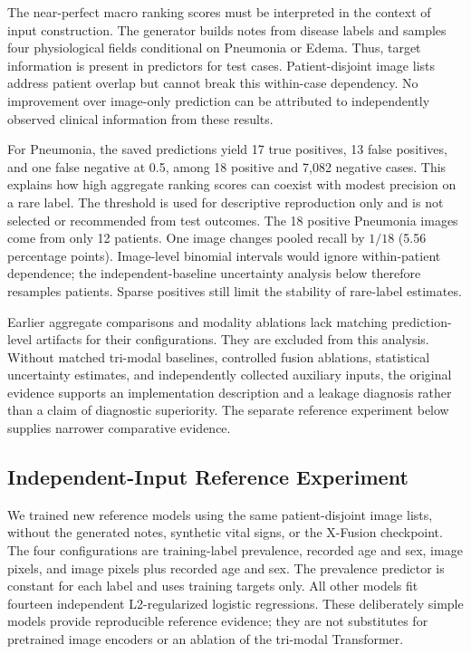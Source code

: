 \documentclass[runningheads,a4paper]{llncs}
\begin{document}
The near-perfect macro ranking scores must be interpreted in the context of input construction. The generator builds notes from disease labels and samples four physiological fields conditional on Pneumonia or Edema. Thus, target information is present in predictors for test cases. Patient-disjoint image lists address patient overlap but cannot break this within-case dependency. No improvement over image-only prediction can be attributed to independently observed clinical information from these results.

For Pneumonia, the saved predictions yield 17 true positives, 13 false positives, and one false negative at 0.5, among 18 positive and 7,082 negative cases. This explains how high aggregate ranking scores can coexist with modest precision on a rare label. The threshold is used for descriptive reproduction only and is not selected or recommended from test outcomes. The 18 positive Pneumonia images come from only 12 patients. One image changes pooled recall by $1/18$ (5.56 percentage points). Image-level binomial intervals would ignore within-patient dependence; the independent-baseline uncertainty analysis below therefore resamples patients. Sparse positives still limit the stability of rare-label estimates.

Earlier aggregate comparisons and modality ablations lack matching prediction-level artifacts for their configurations. They are excluded from this analysis. Without matched tri-modal baselines, controlled fusion ablations, statistical uncertainty estimates, and independently collected auxiliary inputs, the original evidence supports an implementation description and a leakage diagnosis rather than a claim of diagnostic superiority. The separate reference experiment below supplies narrower comparative evidence.

\subsection{Independent-Input Reference Experiment}
We trained new reference models using the same patient-disjoint image lists, without the generated notes, synthetic vital signs, or the X-Fusion checkpoint. The four configurations are training-label prevalence, recorded age and sex, image pixels, and image pixels plus recorded age and sex. The prevalence predictor is constant for each label and uses training targets only. All other models fit fourteen independent L2-regularized logistic regressions. These deliberately simple models provide reproducible reference evidence; they are not substitutes for pretrained image encoders or an ablation of the tri-modal Transformer.
\end{document}

